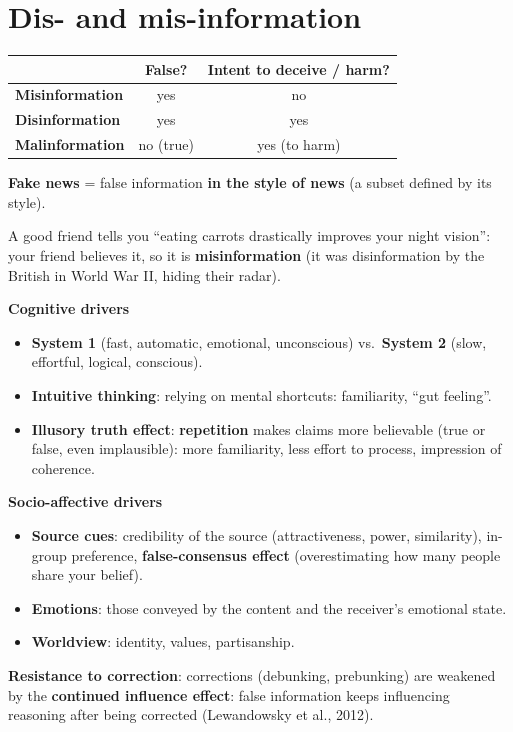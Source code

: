 \documentclass[11pt,a4paper,openany]{book}
\begin{document}
\section{Dis- and mis-information}

\begin{defnbox}[title={Types of false information (Zhou \& Zafarani, 2020; Pennycook \& Rand, 2021)}]
\begin{center}
\begin{tabular}{l|c|c}
 & \textbf{False?} & \textbf{Intent to deceive / harm?} \\ \hline
\textbf{Misinformation}  & yes & no \\
\textbf{Disinformation}  & yes & yes \\
\textbf{Malinformation}  & no (true) & yes (to harm) \\
\end{tabular}
\end{center}
\textbf{Fake news} = false information \textbf{in the style of news} (a subset defined by its
style).
\end{defnbox}

\begin{exbox}[title={Exam-type question}]
A good friend tells you ``eating carrots drastically improves your night vision'': your friend
believes it, so it is \textbf{misinformation} (it was disinformation by the British in World War
II, hiding their radar).
\end{exbox}

\begin{propbox}[title={Why do we believe false information? (Ecker et al., 2022)}]
\textbf{Cognitive drivers}
\begin{itemize}
  \item \textbf{System 1} (fast, automatic, emotional, unconscious) vs.\ \textbf{System 2}
        (slow, effortful, logical, conscious).
  \item \textbf{Intuitive thinking}: relying on mental shortcuts: familiarity, ``gut feeling''.
  \item \textbf{Illusory truth effect}: \textbf{repetition} makes claims more believable (true or
        false, even implausible): more familiarity, less effort to process, impression of
        coherence.
\end{itemize}
\textbf{Socio-affective drivers}
\begin{itemize}
  \item \textbf{Source cues}: credibility of the source (attractiveness, power, similarity),
        in-group preference, \textbf{false-consensus effect} (overestimating how many people
        share your belief).
  \item \textbf{Emotions}: those conveyed by the content and the receiver's emotional state.
  \item \textbf{Worldview}: identity, values, partisanship.
\end{itemize}
\textbf{Resistance to correction}: corrections (debunking, prebunking) are weakened by the
\textbf{continued influence effect}: false information keeps influencing reasoning after being
corrected (Lewandowsky et al., 2012).
\end{propbox}
\end{document}
